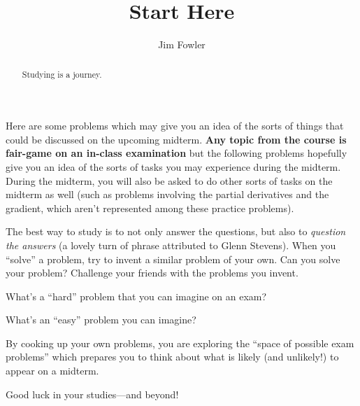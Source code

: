 \documentclass{ximera}
\author{Jim Fowler}
\title{Start Here}
\begin{document}
\begin{abstract}
  Studying is a journey.
\end{abstract}

\maketitle

Here are some problems which may give you an idea of the sorts of
things that could be discussed on the upcoming midterm.  \textbf{Any
  topic from the course is fair-game on an in-class examination} but
the following problems hopefully give you an idea of the sorts of
tasks you may experience during the midterm.  During the midterm, you
will also be asked to do other sorts of tasks on the midterm as well
(such as problems involving the partial derivatives and the gradient,
which aren't represented among these practice problems).

The best way to study is to not only answer the questions, but also to
\textit{question the answers} (a lovely turn of phrase attributed to
Glenn Stevens).  When you ``solve'' a problem, try to invent a similar
problem of your own.  Can you solve your problem?  Challenge your
friends with the problems you invent.

What's a ``hard'' problem that you can imagine on an exam?
\begin{freeResponse}
\end{freeResponse}

What's an ``easy'' problem you can imagine?
\begin{freeResponse}
\end{freeResponse}

By cooking up your own problems, you are exploring the ``space of
possible exam problems'' which prepares you to think about what is
likely (and unlikely!) to appear on a midterm.

Good luck in your studies---and beyond!
\end{document}
